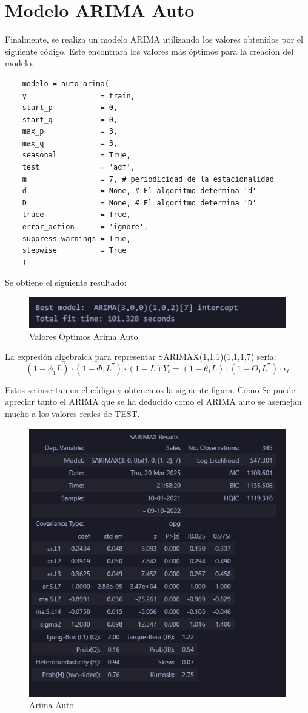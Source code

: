 
\section{Modelo ARIMA Auto}
Finalmente, se realiza un modelo ARIMA utilizando los valores obtenidos por el siguiente código. Este encontrará los valores más óptimos para la creación del modelo.

\begin{lstlisting}
	modelo = auto_arima(
	y                 = train,
	start_p           = 0,
	start_q           = 0,
	max_p             = 3,
	max_q             = 3,
	seasonal          = True,
	test              = 'adf',
	m                 = 7, # periodicidad de la estacionalidad
	d                 = None, # El algoritmo determina 'd'
	D                 = None, # El algoritmo determina 'D'
	trace             = True,
	error_action      = 'ignore',
	suppress_warnings = True,
	stepwise          = True
	)
\end{lstlisting}

Se obtiene el siguiente resultado:
\begin{figure}[!h]
	\centering
	\includegraphics[width=0.7\linewidth]{arima_auto_optimo}
	\caption{Valores Óptimos Arima Auto}
	\label{fig:arimaautooptimo}
\end{figure}
La expresión algebraica para representar SARIMAX(1,1,1)(1,1,1,7) sería:
\begin{equation}[h]
	(1 - \phi_1L)\cdot(1 - \Phi_1L^7)\cdot(1 - L)Y_t = (1 - \theta_1L)\cdot(1 - \Theta_1L^7)\cdot \epsilon_t
\end{equation}

Estos se insertan en el código y obtenemos la siguiente figura. Como Se puede apreciar tanto el ARIMA que se ha deducido como el ARIMA auto se asemejan mucho a los valores reales de TEST.

\begin{figure}[!h]
	\centering
	\includegraphics[width=0.5\linewidth]{sarimax_auto_resultados}
	\caption{Arima Auto}
	\label{fig:sarimaxautoresultados}
\end{figure}

